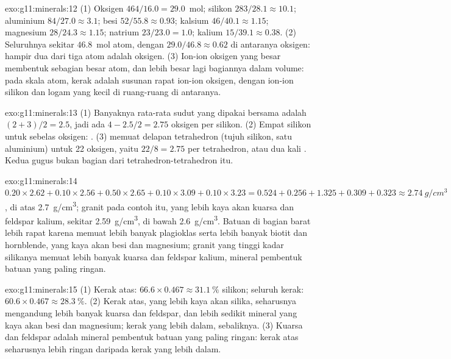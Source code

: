 \begin{solution}{exo:g11:minerals:12}
(1) Oksigen $464/16.0 = 29.0$~mol; silikon $283/28.1 \approx 10.1$; aluminium
$84/27.0 \approx 3.1$; besi $52/55.8 \approx 0.93$; kalsium $46/40.1 \approx
1.15$; magnesium $28/24.3 \approx 1.15$; natrium $23/23.0 = 1.0$; kalium
$15/39.1 \approx 0.38$. (2) Seluruhnya sekitar $46.8$~mol atom, dengan
$29.0/46.8 \approx 0.62$ di antaranya oksigen: hampir dua dari tiga atom adalah
oksigen. (3) Ion-ion oksigen yang besar membentuk sebagian besar atom, dan lebih
besar lagi bagiannya dalam volume: pada skala atom, kerak adalah susunan rapat
ion-ion oksigen, dengan ion-ion silikon dan logam yang kecil di ruang-ruang di
antaranya.
\end{solution}

\begin{solution}{exo:g11:minerals:13}
(1) Banyaknya rata-rata sudut yang dipakai bersama adalah $(2 + 3)/2 = 2.5$, jadi
ada $4 - 2.5/2 = 2.75$ oksigen per silikon. (2) Empat silikon untuk sebelas
oksigen: . (3)  memuat delapan tetrahedron (tujuh
silikon, satu aluminium) untuk 22 oksigen, yaitu $22/8 = 2.75$ per tetrahedron,
atau dua kali . Kedua gugus  bukan bagian dari
tetrahedron-tetrahedron itu.
\end{solution}

\begin{solution}{exo:g11:minerals:14}
$0.20 \times 2.62 + 0.10 \times 2.56 + 0.50 \times 2.65 + 0.10 \times 3.09 +
0.10 \times 3.23 = 0.524 + 0.256 + 1.325 + 0.309 + 0.323 \approx
\qty{2.74}{g/cm^3}$, di atas \qty{2.7}{g/cm^3}; granit pada contoh itu, yang
lebih kaya akan kuarsa dan feldspar kalium, sekitar \qty{2.59}{g/cm^3}, di bawah
\qty{2.6}{g/cm^3}. Batuan di bagian barat lebih rapat karena memuat lebih banyak
plagioklas serta lebih banyak biotit dan hornblende, yang kaya akan besi dan
magnesium; granit yang tinggi kadar silikanya memuat lebih banyak kuarsa dan
feldspar kalium, mineral pembentuk batuan yang paling ringan.
\end{solution}

\begin{solution}{exo:g11:minerals:15}
(1) Kerak atas: $66.6 \times 0.467 \approx \qty{31.1}{\percent}$ silikon;
seluruh kerak: $60.6 \times 0.467 \approx \qty{28.3}{\percent}$. (2) Kerak atas,
yang lebih kaya akan silika, seharusnya mengandung lebih banyak kuarsa dan
feldspar, dan lebih sedikit mineral yang kaya akan besi dan magnesium; kerak yang
lebih dalam, sebaliknya. (3) Kuarsa dan feldspar adalah mineral pembentuk batuan
yang paling ringan: kerak atas seharusnya lebih ringan daripada kerak yang lebih
dalam.
\end{solution}

